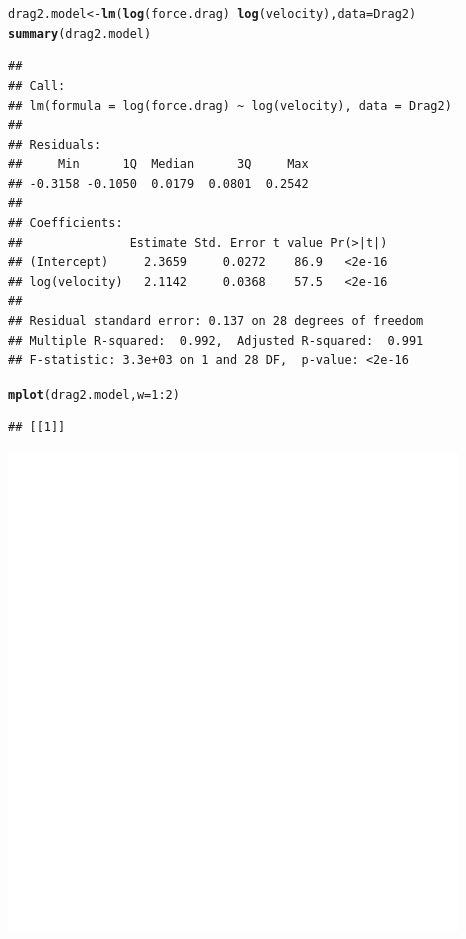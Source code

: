 \documentclass[twoside]{book}\usepackage[]{graphicx}\usepackage[]{xcolor}
\makeatletter
\def\maxwidth{ %
  \ifdim\Gin@nat@width>\linewidth
    \linewidth
  \else
    \Gin@nat@width
  \fi
}
\newcommand{\hlnum}[1]{\textcolor[rgb]{0.686,0.059,0.569}{#1}}%
\newcommand{\hlopt}[1]{\textcolor[rgb]{0,0,0}{#1}}%
\newcommand{\hlstd}[1]{\textcolor[rgb]{0.345,0.345,0.345}{#1}}%
\newcommand{\hlkwb}[1]{\textcolor[rgb]{0.69,0.353,0.396}{#1}}%
\newcommand{\hlkwc}[1]{\textcolor[rgb]{0.333,0.667,0.333}{#1}}%
\newcommand{\hlkwd}[1]{\textcolor[rgb]{0.737,0.353,0.396}{\textbf{#1}}}%
\newenvironment{kframe}{%
 \def\at@end@of@kframe{}%
 \ifinner\ifhmode%
  \def\at@end@of@kframe{\end{minipage}}%
  \begin{minipage}{\columnwidth}%
 \fi\fi%
 \def\FrameCommand##1{\hskip\@totalleftmargin \hskip-\fboxsep
 \colorbox{shadecolor}{##1}\hskip-\fboxsep
     \hskip-\linewidth \hskip-\@totalleftmargin \hskip\columnwidth}%
 \MakeFramed {\advance\hsize-\width
   \@totalleftmargin\z@ \linewidth\hsize
   \@setminipage}}%
 {\par\unskip\endMakeFramed%
 \at@end@of@kframe}
\newenvironment{knitrout}{}{} %
\makeatother
\begin{document}
\begin{solution}
\begin{knitrout}
\end{knitrout}
\begin{knitrout}
\color{fgcolor}\begin{kframe}
\begin{alltt}
\hlstd{drag2.model} \hlkwb{<-} \hlkwd{lm}\hlstd{(}\hlkwd{log}\hlstd{(force.drag)} \hlopt{~} \hlkwd{log}\hlstd{(velocity),} \hlkwc{data} \hlstd{= Drag2)}
\hlkwd{summary}\hlstd{(drag2.model)}
\end{alltt}
\begin{verbatim}
## 
## Call:
## lm(formula = log(force.drag) ~ log(velocity), data = Drag2)
## 
## Residuals:
##     Min      1Q  Median      3Q     Max 
## -0.3158 -0.1050  0.0179  0.0801  0.2542 
## 
## Coefficients:
##               Estimate Std. Error t value Pr(>|t|)
## (Intercept)     2.3659     0.0272    86.9   <2e-16
## log(velocity)   2.1142     0.0368    57.5   <2e-16
## 
## Residual standard error: 0.137 on 28 degrees of freedom
## Multiple R-squared:  0.992,	Adjusted R-squared:  0.991 
## F-statistic: 3.3e+03 on 1 and 28 DF,  p-value: <2e-16
\end{verbatim}
\begin{alltt}
\hlkwd{mplot}\hlstd{(drag2.model,} \hlkwc{w} \hlstd{=} \hlnum{1}\hlopt{:}\hlnum{2}\hlstd{)}
\end{alltt}
\begin{verbatim}
## [[1]]
\end{verbatim}


{\ttfamily\noindent\bfseries\color{errorcolor}{\#\# Error in FUN(X[[i]], ...): object '.resid' not found}}\end{kframe}

{\centering \includegraphics[width=\maxwidth]{figures/fig-unnamed-chunk-326-1} 

}
\end{knitrout}
\end{solution}
\end{document}
